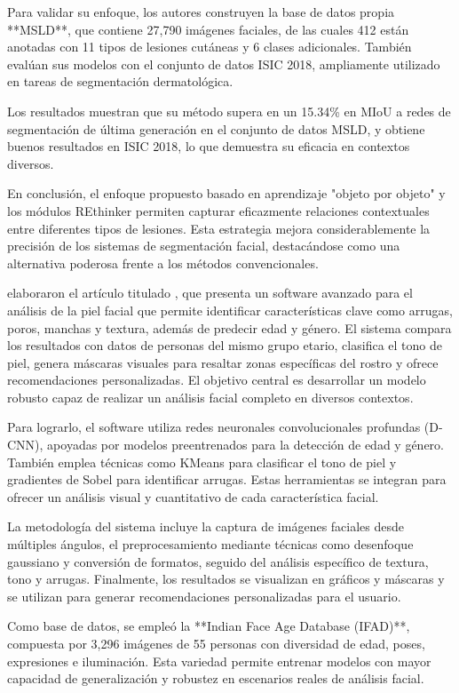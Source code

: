 Para validar su enfoque, los autores construyen la base de datos propia **MSLD**, que contiene 27,790 imágenes faciales, de las cuales 412 están anotadas con 11 tipos de lesiones cutáneas y 6 clases adicionales. También evalúan sus modelos con el conjunto de datos ISIC 2018, ampliamente utilizado en tareas de segmentación dermatológica.  

Los resultados muestran que su método supera en un 15.34\% en MIoU a redes de segmentación de última generación en el conjunto de datos MSLD, y obtiene buenos resultados en ISIC 2018, lo que demuestra su eficacia en contextos diversos.  

En conclusión, el enfoque propuesto basado en aprendizaje "objeto por objeto" y los módulos REthinker permiten capturar eficazmente relaciones contextuales entre diferentes tipos de lesiones. Esta estrategia mejora considerablemente la precisión de los sistemas de segmentación facial, destacándose como una alternativa poderosa frente a los métodos convencionales.

\cite{Tamilkodi2024} elaboraron el artículo titulado , que presenta un software avanzado para el análisis de la piel facial que permite identificar características clave como arrugas, poros, manchas y textura, además de predecir edad y género. El sistema compara los resultados con datos de personas del mismo grupo etario, clasifica el tono de piel, genera máscaras visuales para resaltar zonas específicas del rostro y ofrece recomendaciones personalizadas. El objetivo central es desarrollar un modelo robusto capaz de realizar un análisis facial completo en diversos contextos.  

Para lograrlo, el software utiliza redes neuronales convolucionales profundas (D-CNN), apoyadas por modelos preentrenados para la detección de edad y género. También emplea técnicas como KMeans para clasificar el tono de piel y gradientes de Sobel para identificar arrugas. Estas herramientas se integran para ofrecer un análisis visual y cuantitativo de cada característica facial.  

La metodología del sistema incluye la captura de imágenes faciales desde múltiples ángulos, el preprocesamiento mediante técnicas como desenfoque gaussiano y conversión de formatos, seguido del análisis específico de textura, tono y arrugas. Finalmente, los resultados se visualizan en gráficos y máscaras y se utilizan para generar recomendaciones personalizadas para el usuario.  

Como base de datos, se empleó la **Indian Face Age Database (IFAD)**, compuesta por 3,296 imágenes de 55 personas con diversidad de edad, poses, expresiones e iluminación. Esta variedad permite entrenar modelos con mayor capacidad de generalización y robustez en escenarios reales de análisis facial.  


